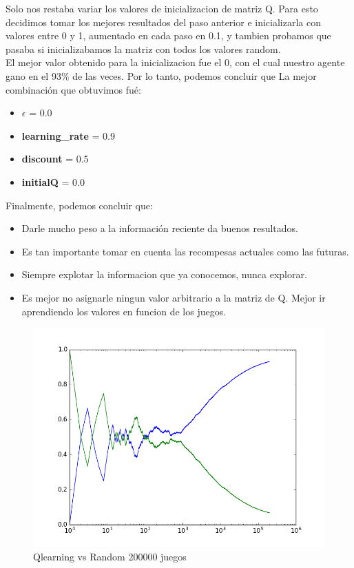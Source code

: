 Solo nos restaba variar los valores de inicializacion de matriz Q. Para esto decidimos tomar los mejores resultados del paso
 anterior e inicializarla con valores entre 0 y 1, aumentado en cada paso en 0.1, y tambien probamos que pasaba si
 inicializabamos la matriz con todos los valores random. \\

El mejor valor obtenido para la inicializacion fue el 0, con el cual nuestro agente gano en el 93\% de las veces.
Por lo tanto, podemos concluir que La mejor combinación que obtuvimos fué:

\begin{itemize}
  \item  \textbf{$\epsilon$} = 0.0
  \item \textbf{learning\_rate} = 0.9
  \item \textbf{discount} = 0.5
  \item \textbf{initialQ} = 0.0
\end{itemize}


Finalmente, podemos concluir que:
\begin{itemize}
  \item  Darle mucho peso a la información reciente da buenos resultados.
  \item  Es tan importante tomar en cuenta las recompesas actuales como las futuras.
  \item  Siempre explotar la informacion que ya conocemos, nunca explorar.
  \item  Es mejor no asignarle ningun valor arbitrario a la matriz de Q. Mejor ir aprendiendo los valores en funcion de
   los juegos.

\end{itemize}
\begin{figure}[h]
 \centering
  \begin{minipage}[c]{1\textwidth}
	\centering
	\includegraphics[scale=0.5]{img/QlearningRandomEgreedy200000.png}
        \caption{Qlearning vs Random 200000 juegos}
  \end{minipage}
\end{figure}

